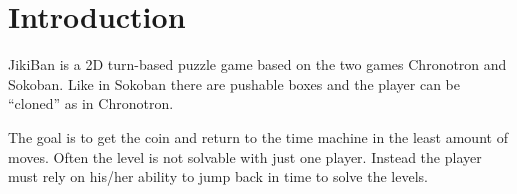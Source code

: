 \section{Introduction}
JikiBan is a 2D turn-based puzzle game based on the two games
Chronotron and Sokoban. Like in Sokoban there are pushable boxes and
the player can be ``cloned'' as in Chronotron.

The goal is to get the coin and return to the time machine in the
least amount of moves.  Often the level is not solvable with just one
player.  Instead the player must rely on his/her ability to jump back
in time to solve the levels.
